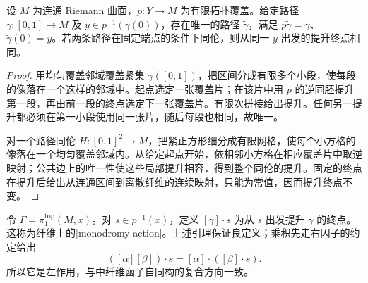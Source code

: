 \begin{lemma}\label{b3:lem:I-path-lifting}
	设 \(M\) 为连通 Riemann 曲面，\(p:Y\rightarrow M\) 为有限拓扑覆盖。给定路径 \(\gamma:[0,1]\rightarrow M\) 及 \(y\in p^{-1}(\gamma(0))\)，存在唯一的路径 \(\widetilde\gamma\)，满足 \(p\widetilde\gamma=\gamma\)、\(\widetilde\gamma(0)=y\)。若两条路径在固定端点的条件下同伦，则从同一 \(y\) 出发的提升终点相同。
\end{lemma}
\begin{proof}
	用均匀覆盖邻域覆盖紧集 \(\gamma([0,1])\)，把区间分成有限多个小段，使每段的像落在一个这样的邻域中。起点选定一张覆盖片；在该片中用 \(p\) 的逆同胚提升第一段，再由前一段的终点选定下一张覆盖片。有限次拼接给出提升。任何另一提升都必须在第一小段使用同一张片，随后每段也相同，故唯一。

	对一个路径同伦 \(H:[0,1]^2\rightarrow M\)，把紧正方形细分成有限网格，使每个小方格的像落在一个均匀覆盖邻域内。从给定起点开始，依相邻小方格在相应覆盖片中取逆映射；公共边上的唯一性使这些局部提升相容，得到整个同伦的提升。固定的终点在提升后给出从连通区间到离散纤维的连续映射，只能为常值，因而提升终点不变。
\end{proof}

令 \(\Gamma=\pi_1^{\mathrm{top}}(M,x)\)。对 \(s\in p^{-1}(x)\)，定义 \([\gamma]\cdot s\) 为从 \(s\) 出发提升 \(\gamma\) 的终点。这称为纤维上的[monodromy action]。上述引理保证良定义；乘积先走右因子的约定给出
\[
	([\alpha][\beta])\cdot s
	=[\alpha]\cdot([\beta]\cdot s).
\]
所以它是左作用，与中纤维函子自同构的复合方向一致。

